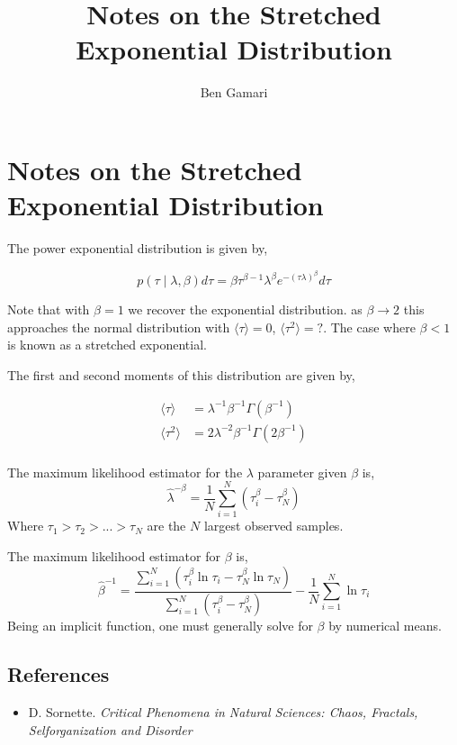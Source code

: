 \documentclass{article}
\title{Notes on the Stretched Exponential Distribution}
\author{Ben Gamari}
\newcommand{\mean}[1]{\ensuremath{\langle #1 \rangle}}
\begin{document}
\section{Notes on the Stretched Exponential Distribution}

The power exponential distribution is given by,

\[ p(\tau \mid \lambda, \beta) d\tau
   = \beta \tau^{\beta-1} \lambda^{\beta} e^{-(\tau \lambda)^\beta} d\tau\]

Note that with $\beta = 1$ we recover the exponential distribution. as
$\beta \rightarrow 2$ this approaches the normal distribution with
$\mean{\tau} = 0$, $\mean{\tau^2} = ?$. The case where $\beta < 1$ is
known as a stretched exponential.

The first and second moments of this distribution are given by,

\begin{align*}
  \mean{\tau} & = \lambda^{-1} \beta^{-1} \Gamma(\beta^{-1}) \\
  \mean{\tau^2} & = 2 \lambda^{-2} \beta^{-1} \Gamma(2\beta^{-1})  \\
\end{align*}

The maximum likelihood estimator for the $\lambda$ parameter given $\beta$ is,
\[ \hat \lambda^{-\beta} = \frac{1}{N} \sum_{i=1}^N (\tau_i^\beta - \tau_N^\beta) \]
Where $\tau_1 > \tau_2 > ... > \tau_N$ are the $N$ largest observed samples.

The maximum likelihood estimator for $\beta$ is,
\[
  \hat\beta^{-1} = \frac{\sum_{i=1}^N (\tau_i^\beta \ln\tau_i -  \tau_N^\beta \ln\tau_N)}
                       {\sum_{i=1}^N (\tau_i^\beta - \tau_N^\beta)}
                  - \frac{1}{N} \sum_{i=1}^N \ln\tau_i
\]
Being an implicit function, one must generally solve for $\beta$ by numerical means.

\subsection{References}
\begin{itemize}
\item D. Sornette. \it{Critical Phenomena in Natural Sciences: Chaos, Fractals, Selforganization and Disorder} 
\end{itemize}
\end{document}
